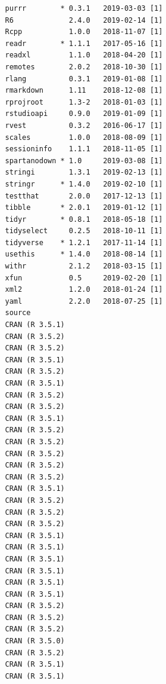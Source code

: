 \documentclass[ms]{uncgdissertationexp}
\theoremstyle{plain}
\theoremstyle{definition}
\theoremstyle{remark}
\begin{document}
\begin{verbatim}
   purrr        * 0.3.1   2019-03-03 [1]
   R6             2.4.0   2019-02-14 [1]
   Rcpp           1.0.0   2018-11-07 [1]
   readr        * 1.1.1   2017-05-16 [1]
   readxl         1.1.0   2018-04-20 [1]
   remotes        2.0.2   2018-10-30 [1]
   rlang          0.3.1   2019-01-08 [1]
   rmarkdown      1.11    2018-12-08 [1]
   rprojroot      1.3-2   2018-01-03 [1]
   rstudioapi     0.9.0   2019-01-09 [1]
   rvest          0.3.2   2016-06-17 [1]
   scales         1.0.0   2018-08-09 [1]
   sessioninfo    1.1.1   2018-11-05 [1]
   spartanodown * 1.0     2019-03-08 [1]
   stringi        1.3.1   2019-02-13 [1]
   stringr      * 1.4.0   2019-02-10 [1]
   testthat       2.0.0   2017-12-13 [1]
   tibble       * 2.0.1   2019-01-12 [1]
   tidyr        * 0.8.1   2018-05-18 [1]
   tidyselect     0.2.5   2018-10-11 [1]
   tidyverse    * 1.2.1   2017-11-14 [1]
   usethis      * 1.4.0   2018-08-14 [1]
   withr          2.1.2   2018-03-15 [1]
   xfun           0.5     2019-02-20 [1]
   xml2           1.2.0   2018-01-24 [1]
   yaml           2.2.0   2018-07-25 [1]
   source                                       
   CRAN (R 3.5.1)                               
   CRAN (R 3.5.2)                               
   CRAN (R 3.5.2)                               
   CRAN (R 3.5.1)                               
   CRAN (R 3.5.2)                               
   CRAN (R 3.5.1)                               
   CRAN (R 3.5.2)                               
   CRAN (R 3.5.2)                               
   CRAN (R 3.5.1)                               
   CRAN (R 3.5.2)                               
   CRAN (R 3.5.2)                               
   CRAN (R 3.5.2)                               
   CRAN (R 3.5.2)                               
   CRAN (R 3.5.2)                               
   CRAN (R 3.5.1)                               
   CRAN (R 3.5.2)                               
   CRAN (R 3.5.2)                               
   CRAN (R 3.5.2)                               
   CRAN (R 3.5.1)                               
   CRAN (R 3.5.1)                               
   CRAN (R 3.5.1)                               
   CRAN (R 3.5.1)                               
   CRAN (R 3.5.1)                               
   CRAN (R 3.5.1)                               
   CRAN (R 3.5.2)                               
   CRAN (R 3.5.2)                               
   CRAN (R 3.5.2)                               
   CRAN (R 3.5.0)                               
   CRAN (R 3.5.2)                               
   CRAN (R 3.5.1)                               
   CRAN (R 3.5.1)                               

\end{verbatim}
\end{document}

